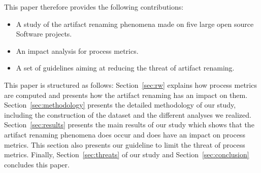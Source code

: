 This paper therefore provides the following contributions:
\begin{itemize}
\item A study of the artifact renaming phenomena made on five large open source Software projects. 
\item An impact analysis for process metrics. 
\item A set of guidelines aiming at reducing the threat of artifact renaming. 
\end{itemize}

This paper is structured as follows: Section~\ref{sec:rw} explains how process metrics are computed and presents how the artifact renaming has an impact on them. Section~\ref{sec:methodology} presents the detailed methodology of our study, including the construction of the dataset and the different analyses we realized. Section~\ref{sec:results} presents the main results of our study which shows that the artifact renaming phenomena does occur and does have an impact on process metrics. This section also presents our guideline to limit the threat of process metrics.
Finally, Section~\ref{sec:threats} of our study and Section~\ref{sec:conclusion} concludes this paper.





